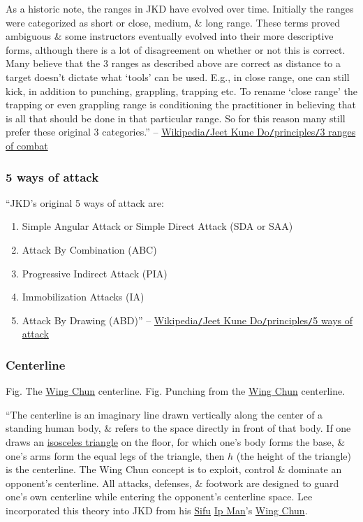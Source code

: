 \documentclass[oneside]{book}
\numberwithin{equation}{section}
\begin{document}
As a historic note, the ranges in JKD have evolved over time. Initially the ranges were categorized as short or close, medium, \& long range. These terms proved ambiguous \& some instructors eventually evolved into their more descriptive forms, although there is a lot of disagreement on whether or not this is correct. Many believe that the 3 ranges as described above are correct as distance to a target doesn't dictate what `tools' can be used. E.g., in close range, one can still kick, in addition to punching, grappling, trapping etc. To rename `close range' the trapping or even grappling range is conditioning the practitioner in believing that is all that should be done in that particular range. So for this reason many still prefer these original 3 categories.'' -- \href{https://en.wikipedia.org/wiki/Jeet_Kune_Do#Three_ranges_of_combat}{Wikipedia\texttt{/}Jeet Kune Do\texttt{/}principles\texttt{/}3 ranges of combat}

\subsubsection{5 ways of attack}
``JKD's original 5 ways of attack are:
\begin{enumerate}
	\item Simple Angular Attack or Simple Direct Attack (SDA or SAA)
	\item Attack By Combination (ABC)
	\item Progressive Indirect Attack (PIA)
	\item Immobilization Attacks (IA)
	\item Attack By Drawing (ABD)'' -- \href{https://en.wikipedia.org/wiki/Jeet_Kune_Do#Five_ways_of_attack}{Wikipedia\texttt{/}Jeet Kune Do\texttt{/}principles\texttt{/}5 ways of attack}
\end{enumerate}

\subsubsection{Centerline}
\textsf{Fig. The \href{https://en.wikipedia.org/wiki/Wing_Chun}{Wing Chun} centerline.} \textsf{Fig. Punching from the \href{https://en.wikipedia.org/wiki/Wing_Chun}{Wing Chun} centerline.}

``The centerline is an imaginary line drawn vertically along the center of a standing human body, \& refers to the space directly in front of that body. If one draws an \href{https://en.wikipedia.org/wiki/Isosceles_triangle}{isosceles triangle} on the floor, for which one's body forms the base, \& one's arms form the equal legs of the triangle, then $h$ (the height of the triangle) is the centerline. The Wing Chun concept is to exploit, control \& dominate an opponent's centerline. All attacks, defenses, \& footwork are designed to guard one's own centerline while entering the opponent's centerline space. Lee incorporated this theory into JKD from his \href{https://en.wikipedia.org/wiki/Sifu}{Sifu} \href{https://en.wikipedia.org/wiki/Ip_Man}{Ip Man}'s \href{https://en.wikipedia.org/wiki/Wing_Chun}{Wing Chun}.
\end{document}
